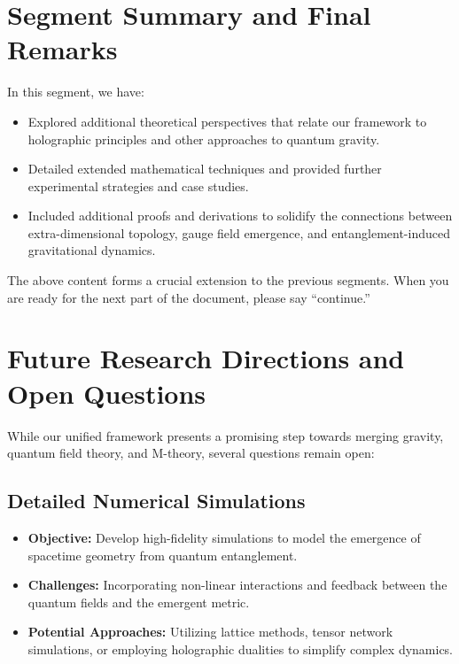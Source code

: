 \documentclass[12pt, a4paper]{article}
\begin{document}
\section*{Segment Summary and Final Remarks}
In this segment, we have:
\begin{itemize}
    \item Explored additional theoretical perspectives that relate our framework to holographic principles and other approaches to quantum gravity.
    \item Detailed extended mathematical techniques and provided further experimental strategies and case studies.
    \item Included additional proofs and derivations to solidify the connections between extra-dimensional topology, gauge field emergence, and entanglement-induced gravitational dynamics.
\end{itemize}

The above content forms a crucial extension to the previous segments. When you are ready for the next part of the document, please say “continue.”

\section{Future Research Directions and Open Questions}
While our unified framework presents a promising step towards merging gravity, quantum field theory, and M-theory, several questions remain open:

\subsection{Detailed Numerical Simulations}
\begin{itemize}
    \item \textbf{Objective:} Develop high-fidelity simulations to model the emergence of spacetime geometry from quantum entanglement.
    \item \textbf{Challenges:} Incorporating non-linear interactions and feedback between the quantum fields and the emergent metric.
    \item \textbf{Potential Approaches:} Utilizing lattice methods, tensor network simulations, or employing holographic dualities to simplify complex dynamics.
\end{itemize}
\end{document}
